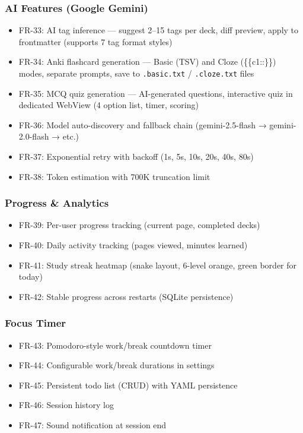 \documentclass[14pt]{article}
\begin{document}
\subsubsection{AI Features (Google Gemini)}
\label{sec:org2729112}
\begin{itemize}
\item FR-33: AI tag inference — suggest 2--15 tags per deck, diff preview,
apply to frontmatter (supports 7 tag format styles)
\item FR-34: Anki flashcard generation — Basic (TSV) and Cloze (\{\{c1::\}\})
modes, separate prompts, save to \texttt{.basic.txt} / \texttt{.cloze.txt} files
\item FR-35: MCQ quiz generation — AI-generated questions, interactive
quiz in dedicated WebView (4 option list, timer, scoring)
\item FR-36: Model auto-discovery and fallback chain (gemini-2.5-flash →
gemini-2.0-flash → etc.)
\item FR-37: Exponential retry with backoff (1s, 5s, 10s, 20s, 40s, 80s)
\item FR-38: Token estimation with 700K truncation limit
\end{itemize}
\subsubsection{Progress \& Analytics}
\label{sec:org9dcd2da}
\begin{itemize}
\item FR-39: Per-user progress tracking (current page, completed decks)
\item FR-40: Daily activity tracking (pages viewed, minutes learned)
\item FR-41: Study streak heatmap (snake layout, 6-level orange, green border for
today)
\item FR-42: Stable progress across restarts (SQLite persistence)
\end{itemize}

\newpage
\subsubsection{Focus Timer}
\label{sec:orge2ccdb4}
\begin{itemize}
\item FR-43: Pomodoro-style work/break countdown timer
\item FR-44: Configurable work/break durations in settings
\item FR-45: Persistent todo list (CRUD) with YAML persistence
\item FR-46: Session history log
\item FR-47: Sound notification at session end
\end{itemize}
\end{document}
